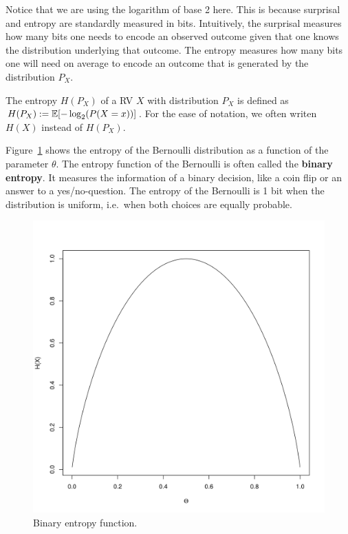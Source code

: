 Notice that we are using the logarithm of base 2 here. This is because surprisal and entropy are standardly measured in bits. Intuitively, the surprisal measures
how many bits one needs to encode an observed outcome given that one knows the distribution underlying that outcome. The entropy measures how many bits one
will need on average to encode an outcome that is generated by the distribution $ P_{X} $.

\begin{Definition}[Entropy]
The entropy $H(P_X)$ of a RV $ X $ with distribution $P_X$ is defined as $H(P_X) := \mathbb{E}[-\log_{2}(P(X=x))]$. For the ease of notation, we often writen $H(X)$ instead of $H(P_X)$.
\end{Definition}

Figure~\ref{fig:binaryEntropy} shows the entropy of the Bernoulli distribution as a function of the
parameter $ \theta $. The entropy function of the Bernoulli is often called the \textbf{binary entropy}.
It measures the information of a binary decision, like a coin flip or an answer to a yes/no-question.
The entropy of the Bernoulli is 1 bit when the distribution is uniform, i.e.\ when both choices are equally 
probable. 

\begin{figure}
\center
\includegraphics[scale=0.4]{binaryEntropy.png}
\caption{Binary entropy function.}
\label{fig:binaryEntropy}
\end{figure}

